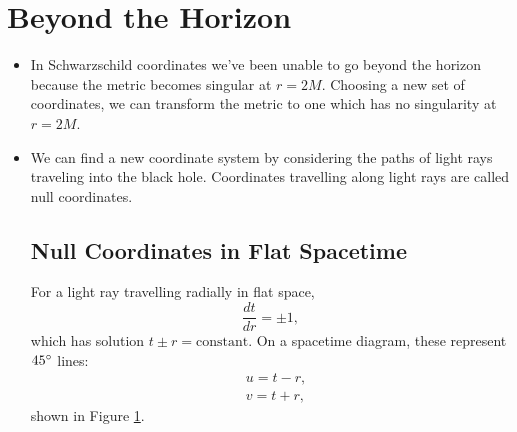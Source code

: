 \documentclass[10pt]{article}
\begin{document}
\section{Beyond the Horizon}\label{sec:beyondhorizon}
\begin{itemize}
\item In Schwarzschild coordinates we've been unable to go beyond the horizon because the metric becomes singular at $r=2M$. Choosing a new set of coordinates, we can transform the metric to one which has no singularity at $r=2M$.

\item We can find a new coordinate system by considering the paths of light rays traveling into the black hole. Coordinates travelling along light rays are called null coordinates.

\subsection{Null Coordinates in Flat Spacetime}
For a light ray travelling radially in flat space,
\begin{equation}\label{eq:nullray}
\dfrac{dt}{dr}=\pm 1,
\end{equation}
which has solution $t \pm r = \text{constant}$.
On a spacetime diagram, these represent $45\degree$ lines:
\begin{align}
&u = t-r,
\\
&v = t+r,
\end{align}
shown in Figure \ref{fig:const_u_v}.
\begin{figure}[h]\label{fig:const_u_v}
\centering
{} %

\begin{tikzpicture}[x=0.75pt,y=0.75pt,yscale=-1,xscale=1]


\end{tikzpicture}
\end{figure}
\end{itemize}
\end{document}
